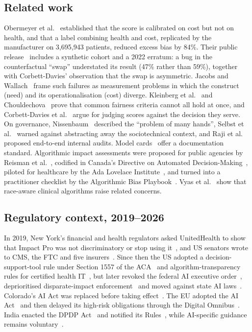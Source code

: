 \documentclass[conference]{IEEEtran}
\begin{document}
\subsection{Related work}
Obermeyer et al.~\cite{obermeyer2019} established that the score is calibrated on cost but not on health, and that a label combining health and cost, replicated by the manufacturer on 3,695,943 patients, reduced excess bias by 84\%. Their public release~\cite{labsysmed} includes a synthetic cohort and a 2022 erratum: a bug in the counterfactual ``swap'' understated its result (47\% rather than 59\%), together with Corbett-Davies' observation that the swap is asymmetric. Jacobs and Wallach~\cite{jacobs2021} frame such failures as measurement problems in which the construct (need) and its operationalisation (cost) diverge. Kleinberg et al.~\cite{kleinberg2017} and Chouldechova~\cite{chouldechova2017} prove that common fairness criteria cannot all hold at once, and Corbett-Davies et al.~\cite{corbett2023} argue for judging scores against the decision they serve. On governance, Nissenbaum~\cite{nissenbaum1996} described the ``problem of many hands'', Selbst et al.~\cite{selbst2019} warned against abstracting away the sociotechnical context, and Raji et al.~\cite{raji2020} proposed end-to-end internal audits. Model cards~\cite{mitchell2019} offer a documentation standard. Algorithmic impact assessments were proposed for public agencies by Reisman et al.~\cite{reisman2018}, codified in Canada's Directive on Automated Decision-Making~\cite{canada_dadm}, piloted for healthcare by the Ada Lovelace Institute~\cite{ada2022}, and turned into a practitioner checklist by the Algorithmic Bias Playbook~\cite{booth2021}. Vyas et al.~\cite{vyas2020} show that race-aware clinical algorithms raise related concerns.

\subsection{Regulatory context, 2019--2026}
In 2019, New York's financial and health regulators asked UnitedHealth to show that Impact Pro was not discriminatory or stop using it~\cite{dfs2019}, and US senators wrote to CMS, the FTC and five insurers~\cite{booker2019}. Since then the US adopted a decision-support-tool rule under Section 1557 of the ACA~\cite{hhs1557,ocr2025} and algorithm-transparency rules for certified health IT~\cite{hti1}, but later revoked the federal AI executive order~\cite{eo14148}, deprioritised disparate-impact enforcement~\cite{eo14281,hhs_tvi2026} and moved against state AI laws~\cite{eo14365}. Colorado's AI Act was replaced before taking effect~\cite{colorado}. The EU adopted the AI Act~\cite{euaiact} and then delayed its high-risk obligations through the Digital Omnibus~\cite{omnibus2026}. India enacted the DPDP Act~\cite{dpdp2023} and notified its Rules~\cite{dpdprules2025}, while AI-specific guidance remains voluntary~\cite{icmr2023,niti2021,meity2025}.
\end{document}
